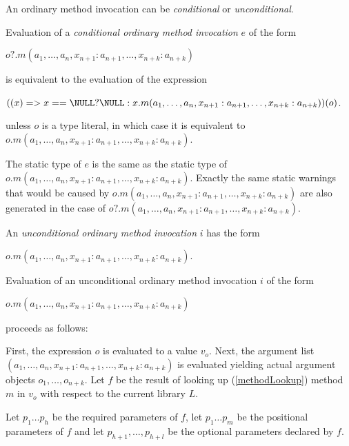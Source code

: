 \documentclass{article}
\begin{document}
\LMHash{}
An ordinary method invocation can be {\em conditional} or {\em unconditional}.

\LMHash{}
Evaluation of a {\em conditional ordinary method invocation} $e$ of the form 

\LMHash{}
$o?.m(a_1, \ldots , a_n, x_{n+1}: a_{n+1}, \ldots , x_{n+k}: a_{n+k})$  

\LMHash{}
is equivalent to the evaluation of the expression  

\LMHash{}
$((x) => x == \NULL ? \NULL : x.m(a_1, \ldots , a_n, x_{n+1}: a_{n+1}, \ldots , x_{n+k}: a_{n+k}))(o)$. 

unless $o$ is  a type literal, in which case it is equivalent to $o.m(a_1, \ldots , a_n, x_{n+1}: a_{n+1}, \ldots , x_{n+k}: a_{n+k})$.

\LMHash{}
The static type of $e$ is the same as the static type of $o.m(a_1, \ldots , a_n, x_{n+1}: a_{n+1}, \ldots , x_{n+k}: a_{n+k})$. Exactly the same static warnings that would be caused by $o.m(a_1, \ldots , a_n, x_{n+1}: a_{n+1}, \ldots , x_{n+k}: a_{n+k})$ are also generated in the case of $o?.m(a_1, \ldots , a_n, x_{n+1}: a_{n+1}, \ldots , x_{n+k}: a_{n+k})$.

\LMHash{}
An {\em unconditional ordinary method invocation} $i$ has the form 

$o.m(a_1, \ldots , a_n, x_{n+1}: a_{n+1}, \ldots , x_{n+k}: a_{n+k})$.

\LMHash{}
Evaluation of an unconditional ordinary method invocation $i$ of the form 

$o.m(a_1, \ldots , a_n, x_{n+1}: a_{n+1}, \ldots , x_{n+k}: a_{n+k})$ 

proceeds as follows:

\LMHash{}
First, the expression $o$ is evaluated to a value $v_o$. Next, the argument list $(a_1, \ldots , a_n, x_{n+1}: a_{n+1}, \ldots , x_{n+k}: a_{n+k})$ is evaluated yielding actual argument objects $o_1, \ldots , o_{n+k}$. Let $f$ be the result of looking up (\ref{methodLookup}) method $m$  in $v_o$ with respect to the current library $L$. 

\LMHash{}
Let $p_1 \ldots p_h$ be the required parameters of $f$,  let $p_1 \ldots p_m$ be the positional parameters of $f$ and let $p_{h+1}, \ldots, p_{h+l}$ be the optional parameters declared by $f$.

\end{document}
